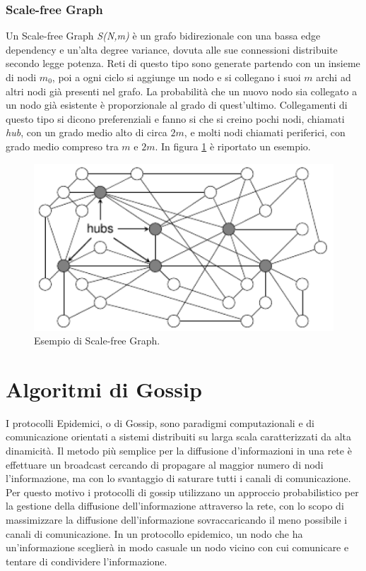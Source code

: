 \subsubsection{Scale-free Graph}
Un Scale-free Graph \textit{S(N,m)} è un grafo bidirezionale con una bassa edge dependency e un'alta degree variance, dovuta alle sue connessioni distribuite secondo legge potenza. Reti di questo tipo sono generate partendo con un insieme di nodi $\mathit{m_0}$, poi a ogni ciclo si aggiunge un nodo e si collegano i suoi $\textit{m}$ archi ad altri nodi già presenti nel grafo. La probabilità che un nuovo nodo sia collegato a un nodo già esistente è proporzionale al grado di quest'ultimo. Collegamenti di questo tipo si dicono preferenziali e fanno si che si creino pochi nodi, chiamati \textit{hub}, con un grado medio alto di circa $\textit{2m}$, e molti nodi chiamati periferici, con grado medio compreso tra $\textit{m}$ e $\textit{2m}$. In figura \ref{fig:scale-free} è riportato un esempio.
\bigskip
\begin{figure}[h]
	\centering
	\includegraphics[width=0.7\linewidth,keepaspectratio]{Images/reti/scale-free}
	\caption[Scale-free Graph]{Esempio di Scale-free Graph\cite{comparisonGAonRT2014-ita}.}
	\label{fig:scale-free}
\end{figure}
\medskip

\section{Algoritmi di Gossip}
I protocolli Epidemici, o di Gossip, sono paradigmi computazionali e di comunicazione orientati a sistemi distribuiti su larga scala caratterizzati da alta dinamicità. Il metodo più semplice per la diffusione d'informazioni in una rete è effettuare un broadcast cercando di propagare al maggior numero di nodi l'informazione, ma con lo svantaggio di saturare tutti i canali di comunicazione. Per questo motivo i protocolli di gossip utilizzano un approccio probabilistico per la gestione della diffusione dell'informazione attraverso la rete, con lo scopo di massimizzare la diffusione dell'informazione sovraccaricando il meno possibile i canali di comunicazione. In un protocollo epidemico, un nodo che ha un'informazione sceglierà in modo casuale un nodo vicino con cui comunicare e tentare di condividere l'informazione.

